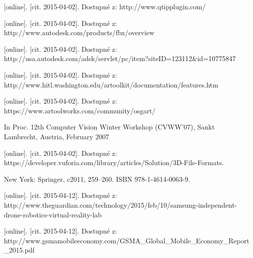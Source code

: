 \documentclass[twoside,12pt]{article}
\begin{document}
\begin{literatura}
{
	 [online]. [cit. 2015-04-02]. Dostupné z: http://www.qtipplugin.com/
}

{
	 [online]. [cit. 2015-04-02]. Dostupné z: http://www.autodesk.com/products/fbx/overview
}

{
	 [online]. [cit. 2015-04-02]. Dostupné z: http://usa.autodesk.com/adsk/servlet/pc/item?siteID=123112\&id=10775847
}

{
	 [online]. [cit. 2015-04-02]. Dostupné z: http://www.hitl.washington.edu/artoolkit/documentation/features.htm
}

{
	 [online]. [cit. 2015-04-02]. Dostupné z: https://www.artoolworks.com/community/osgart/
}

{
In Proc. 12th Computer Vision Winter Workshop (CVWW'07), Sankt Lambrecht, Austria, February 2007
}

{
	 [online]. [cit. 2015-04-02]. Dostupné z: https://developer.vuforia.com/library/articles/Solution/3D-File-Formats.
}

{
	 New York: Springer, c2011, 259–260. ISBN 978-1-4614-0063-9.
}
 

{
	[online]. [cit. 2015-04-12]. Dostupné z: http://www.theguardian.com/technology/2015/feb/10/samsung-independent-drone-robotics-virtual-reality-lab
}

{
	[online]. [cit. 2015-04-12]. Dostupné z: http://www.gsmamobileeconomy.com/GSMA\_Global\_Mobile\_Economy\_Report \_2015.pdf
}


\end{literatura}
\end{document}
